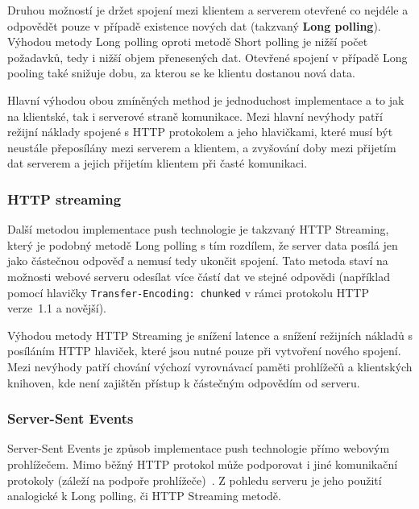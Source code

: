 Druhou možností je držet spojení mezi klientem a serverem otevřené co nejdéle a odpovědět pouze v případě existence nových dat (takzvaný \textbf{Long polling}).
Výhodou metody Long polling oproti metodě Short polling je nižší počet požadavků, tedy i nižší objem přenesených dat.
Otevřené spojení v případě Long pooling také snižuje dobu, za kterou se ke klientu dostanou nová data.

Hlavní výhodou obou zmíněných method je jednoduchost implementace a to jak na klientské, tak i serverové straně komunikace.
Mezi hlavní nevýhody patří režijní náklady spojené s \gls{HTTP} protokolem a jeho hlavičkami, které musí být neustále přeposílány mezi serverem a klientem, a zvyšování doby mezi přijetím dat serverem a jejich přijetím klientem při časté komunikaci.~\cite{pushpull:issuesRFC}

\subsubsection{\gls{HTTP} streaming}\label{subsubsec:HTTPStreaming}

Další metodou implementace push technologie je takzvaný \gls{HTTP} Streaming, který je podobný metodě Long polling s tím rozdílem, že server data posílá jen jako částečnou odpověď a nemusí tedy ukončit spojení.
Tato metoda staví na možnosti webové serveru odesílat více částí dat ve stejné odpovědi (například pomocí hlavičky \texttt{Transfer-Encoding: chunked} v rámci protokolu \gls{HTTP} verze~1.1 a novější).

Výhodou metody \gls{HTTP} Streaming je snížení latence a snížení režijních nákladů s posíláním \gls{HTTP} hlaviček, které jsou nutné pouze při vytvoření nového spojení.
Mezi nevýhody patří chování výchozí vyrovnávací paměti prohlížečů a klientských knihoven, kde není zajištěn přístup k částečným odpovědím od serveru.~\cite{pushpull:issuesRFC}

\subsubsection{Server-Sent Events}\label{subsubsec:serverSentEvents}

Server-Sent Events je způsob implementace push technologie přímo webovým prohlížečem.
Mimo běžný \gls{HTTP} protokol může podporovat i jiné komunikační protokoly (záleží na podpoře prohlížeče)~\cite{pushpull:events}.
Z pohledu serveru je jeho použití analogické k Long polling, či \gls{HTTP} Streaming metodě.~\cite{pushpull:compare}

